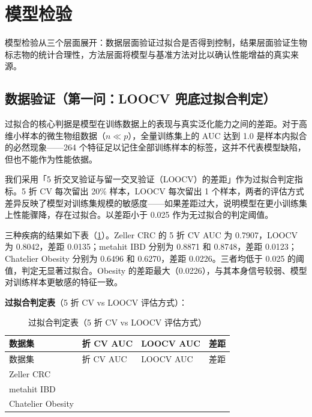 \section{模型检验}
\label{sec:testing}

模型检验从三个层面展开：数据层面验证过拟合是否得到控制，结果层面验证生物标志物的统计合理性，方法层面将模型与基准方法对比以确认性能增益的真实来源。

\subsection{数据验证（第一问：LOOCV 兜底过拟合判定）}

过拟合的核心判据是模型在训练数据上的表现与真实泛化能力之间的差距。对于高维小样本的微生物组数据（$n \ll p$），全量训练集上的 AUC 达到 1.0 是样本内拟合的必然现象——264 个特征足以记住全部训练样本的标签，这并不代表模型缺陷，但也不能作为性能依据。

我们采用「5 折交叉验证与留一交叉验证（LOOCV）的差距」作为过拟合判定指标。5 折 CV 每次留出 20\% 样本，LOOCV 每次留出 1 个样本，两者的评估方式差异反映了模型对训练集规模的敏感度——如果差距过大，说明模型在更小训练集上性能骤降，存在过拟合。以差距小于 0.025 作为无过拟合的判定阈值。

三种疾病的结果如下表（\cref{tab:overfit}）。Zeller CRC 的 5 折 CV AUC 为 0.7907，LOOCV 为 0.8042，差距 0.0135；metahit IBD 分别为 0.8871 和 0.8748，差距 0.0123；Chatelier Obesity 分别为 0.6496 和 0.6270，差距 0.0226。三者均低于 0.025 的阈值，判定无显著过拟合。Obesity 的差距最大（0.0226），与其本身信号较弱、模型对训练样本更敏感的特征一致。

\textbf{过拟合判定表}（5 折 CV vs LOOCV 评估方式）：

{\small
\begin{longtable}{>{\centering\arraybackslash}p{}>{\centering\arraybackslash}p{}>{\centering\arraybackslash}p{}>{\centering\arraybackslash}p{}}
\caption{过拟合判定表（5 折 CV vs LOOCV 评估方式）}\label{tab:overfit}\\
\toprule
数据集 & 5 折 CV AUC & LOOCV AUC & 差距 \\
\midrule
\endfirsthead
\toprule
数据集 & 5 折 CV AUC & LOOCV AUC & 差距 \\
\midrule
\endhead
\bottomrule
\endlastfoot
Zeller CRC & 0.7907 & 0.8042 & 0.0135 \\
metahit IBD & 0.8871 & 0.8748 & 0.0123 \\
Chatelier Obesity & 0.6496 & 0.6270 & 0.0226 \\
\end{longtable}
}

